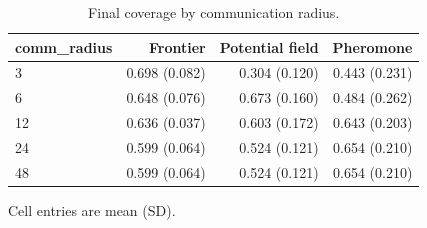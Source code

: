 \begin{table}[t]
\centering
\caption{Final coverage by communication radius.}
\label{tab:by-comm}
\begin{tabular}{lrrr}
\toprule
comm\_radius & Frontier & Potential field & Pheromone \\
\midrule
3 & 0.698 (0.082) & 0.304 (0.120) & 0.443 (0.231) \\
6 & 0.648 (0.076) & 0.673 (0.160) & 0.484 (0.262) \\
12 & 0.636 (0.037) & 0.603 (0.172) & 0.643 (0.203) \\
24 & 0.599 (0.064) & 0.524 (0.121) & 0.654 (0.210) \\
48 & 0.599 (0.064) & 0.524 (0.121) & 0.654 (0.210) \\
\bottomrule
\end{tabular}
\par\vspace{2pt}\footnotesize Cell entries are mean (SD).
\end{table}
